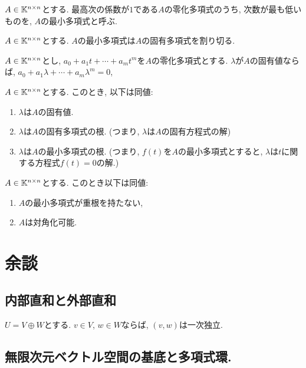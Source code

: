 \begin{definition}
$A\in\mathbb{K}^{n\times n}$とする.
最高次の係数が$1$である$A$の零化多項式のうち, 
次数が最も低いものを,
$A$の最小多項式と呼ぶ.
\end{definition}

\begin{cor}
$A\in\mathbb{K}^{n\times n}$とする.
$A$の最小多項式は$A$の固有多項式を割り切る.
\end{cor}
\begin{prop}
$A\in\mathbb{K}^{n\times n}$とし,
$a_0+a_1t+\cdots+a_mt^m$を$A$の零化多項式とする.
$\lambda$が$A$の固有値ならば,
$a_0+a_1\lambda+\cdots+a_m\lambda^m=0$,
\end{prop}
\begin{cor}
$A\in\mathbb{K}^{n\times n}$とする.
このとき, 以下は同値:
\begin{enumerate}
\item $\lambda$は$A$の固有値.
\item $\lambda$は$A$の固有多項式の根.
(つまり, $\lambda$は$A$の固有方程式の解)
\item $\lambda$は$A$の最小多項式の根.
(つまり, $f(t)$を$A$の最小多項式とすると,
$\lambda$は$t$に関する方程式$f(t)=0$の解.)
\end{enumerate}
\end{cor}

\begin{prop}
$A\in\mathbb{K}^{n\times n}$とする.
このとき以下は同値:
\begin{enumerate}
\item
$A$の最小多項式が重根を持たない,
\item
$A$は対角化可能.
\end{enumerate}
\end{prop}

\begin{quiz}
\end{quiz}




\chapter{}
\begin{quiz}
\end{quiz}



\chapter{余談}
\section{内部直和と外部直和}
\begin{prop}
  $U=V\oplus W$とする.
  $v\in V$, $w\in W$ならば,
  $(v,w)$は一次独立.
\end{prop}

\section{無限次元ベクトル空間の基底と多項式環.}
\begin{quiz}
\end{quiz}



